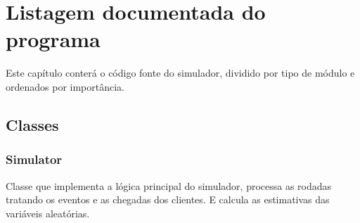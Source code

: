 \lstset{
  language=Python,
  breaklines=true,
  numbers=left,
  numberstyle=\footnotesize,
  stepnumber=1,
  numbersep=5pt
}

\chapter{Listagem documentada do programa}

Este capítulo conterá o código fonte do simulador, dividido por tipo de módulo e ordenados por importância.\\

\section{Classes}

\subsection{Simulator}
Classe que implementa a lógica principal do simulador, processa as rodadas tratando os eventos e as chegadas dos clientes. E calcula as estimativas das variáveis aleatórias.\\

